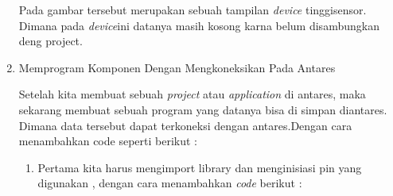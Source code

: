 \begin{enumerate}
    \par Pada gambar tersebut merupakan sebuah tampilan \textit{device} tinggisensor. Dimana pada \textit{device}ini datanya masih kosong karna belum disambungkan deng project.
    
    \item Memprogram Komponen Dengan Mengkoneksikan Pada Antares
    
    \par Setelah kita membuat sebuah \textit{project} atau \textit{application} di antares, maka sekarang membuat sebuah program yang datanya bisa di simpan diantares. Dimana data tersebut dapat terkoneksi dengan antares.Dengan cara menambahkan code seperti berikut :
    \begin{enumerate}
        \item Pertama kita harus mengimport library dan menginisiasi pin yang digunakan , dengan cara menambahkan \textit{code} berikut :
        
        

\end{enumerate}
\end{enumerate}
